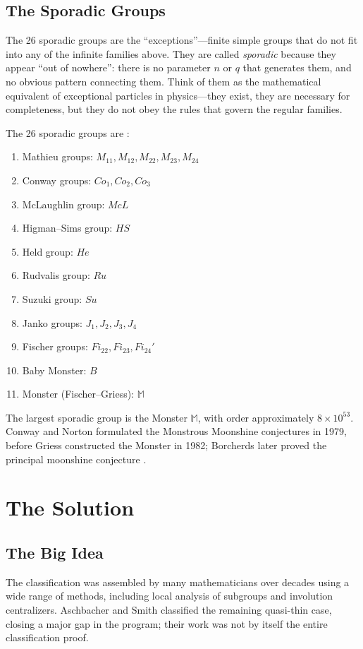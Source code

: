 \subsection{The Sporadic Groups}

The 26 sporadic groups are the ``exceptions''---finite simple groups that do not fit into any of the infinite families above. They are called \emph{sporadic} because they appear ``out of nowhere'': there is no parameter $n$ or $q$ that generates them, and no obvious pattern connecting them. Think of them as the mathematical equivalent of exceptional particles in physics---they exist, they are necessary for completeness, but they do not obey the rules that govern the regular families.

The 26 sporadic groups are \cite{conway1985}:

\begin{enumerate}
\item Mathieu groups: $M_{11}, M_{12}, M_{22}, M_{23}, M_{24}$
\item Conway groups: $Co_1, Co_2, Co_3$
\item McLaughlin group: $McL$
\item Higman--Sims group: $HS$
\item Held group: $He$
\item Rudvalis group: $Ru$
\item Suzuki group: $Su$
\item Janko groups: $J_1, J_2, J_3, J_4$
\item Fischer groups: $Fi_{22}, Fi_{23}, Fi_{24}'$
\item Baby Monster: $B$
\item Monster (Fischer--Griess): $\mathbb{M}$
\end{enumerate}

The largest sporadic group is the Monster $\mathbb{M}$, with order approximately $8 \times 10^{53}$. Conway and Norton formulated the Monstrous Moonshine conjectures in 1979, before Griess constructed the Monster in 1982; Borcherds later proved the principal moonshine conjecture \cite{conway1979}.

\section{The Solution}

\subsection{The Big Idea}
The classification was assembled by many mathematicians over decades using a wide range of methods, including local analysis of subgroups and involution centralizers. Aschbacher and Smith classified the remaining quasi-thin case, closing a major gap in the program; their work was not by itself the entire classification proof.

